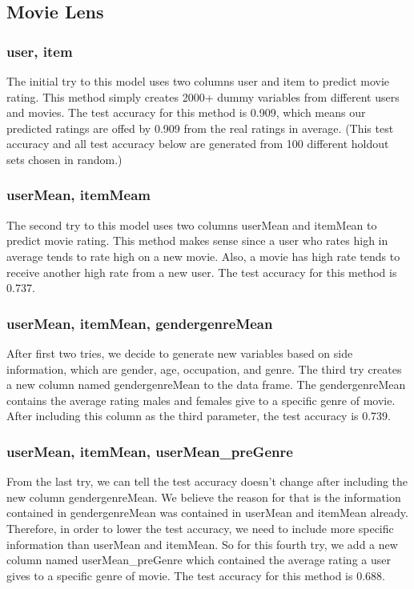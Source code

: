 \documentclass{article}
\begin{document}
\subsection{Movie Lens}
\subsubsection{user, item}
The initial try to this model uses two columns user and item to predict movie rating. This method simply creates 2000+ dummy variables from different users and movies. The test accuracy for this method is 0.909, which means our predicted ratings are offed by 0.909 from the real ratings in average. (This test accuracy and all test accuracy below are generated from 100 different holdout sets chosen in random.)
\subsubsection{userMean, itemMeam}
The second try to this model uses two columns userMean and itemMean to predict movie rating. This method makes sense since a user who rates high in average tends to rate high on a new movie. Also, a movie has high rate tends to receive another high rate from a new user. The test accuracy for this method is 0.737.
\subsubsection{userMean, itemMean, gendergenreMean}
After first two tries, we decide to generate new variables based on side information, which are gender, age, occupation, and genre. The third try creates a new column named gendergenreMean to the data frame. The gendergenreMean contains the average rating males and females give to a specific genre of movie. After including this column as the third parameter, the test accuracy is 0.739.
\subsubsection{userMean, itemMean, userMean\_preGenre}
From the last try, we can tell the test accuracy doesn't change after including the new column gendergenreMean. We believe the reason for that is the information contained in gendergenreMean was contained in userMean and itemMean already. Therefore, in order to lower the test accuracy, we need to include more specific information than userMean and itemMean. So for this fourth try, we add a new column named userMean\_preGenre which contained the average rating a user gives to a specific genre of movie. The test accuracy for this method is 0.688.
\end{document}

